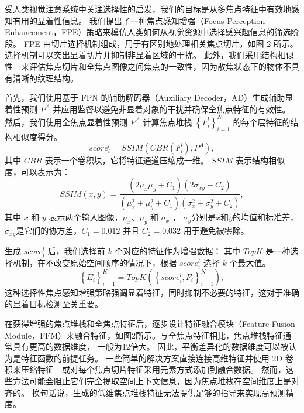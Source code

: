 受人类视觉注意系统中关注选择性的启发，我们的目标是从多焦点特征中有效地感知有用的显着性信息。 我们提出了一种焦点感知增强（Focus Perception Enhancement，FPE）策略来模仿人类如何从视觉资源中选择感兴趣信息的筛选阶段。 FPE 由切片选择机制组成，用于有区别地处理相关焦点切片，如图 2 所示。选择机制可以突出显着切片并抑制非显着区域的干扰。 此外，我们采用结构相似性~\cite{wang2003multiscale}~来评估焦点切片和全焦点图像之间焦点的一致性，因为散焦状态下的物体不具有清晰的纹理结构。 
%
%
%
%
\par
%
%
首先，我们使用基于 FPN 的辅助解码器（Auxiliary Decoder，AD）生成辅助显着性预测 $ P^{A} $ 并应用监督以避免非显着对象的干扰并确保全焦点特征的有效性。 然后，我们使用全焦点显着性预测 $ P^{A} $ 计算焦点堆栈 $ \left \{ F_{i}^{l} \right \}_{i=1}^{N} $ 的每个层特征的结构相似度得分。 
\begin{equation}
	score_{i}^{l} = SSIM \left ( CBR \left ( F_{i}^{l} \right ), P^{A} \right ),
\end{equation}
%
%
其中 $CBR$ 表示一个卷积块，它将特征通道压缩成一维。 $SSIM$ 表示结构相似度，可以表示为： 
%
%
\begin{equation} 	
	SSIM(x,y)=\frac{\left ( 2\mu_{x}\mu_{y}+C_{1} \right ) \left (  2\sigma_{xy}+C_{2} \right )  } 	
	{\left ( \mu_{x}^{2} + \mu_{y}^{2}+C_{1}\right ) \left ( \sigma_{x}^{2}+ \sigma_{y}^{2} + C_{2} \right ) } , 	
\end{equation}
其中 $x$ 和 $y$ 表示两个输入图像，$\mu_{x}$、$\mu_{y}$ 和 $\sigma_{x}$ ， $\sigma_{y}$分别是$x$和$y$的均值和标准差，$\sigma_{xy}$是它们的协方差，$C_{1} = 0.012$ 并且 $C_{2} = 0.032$ 用于避免被零除。 
%
%
%
%
\par
%
%
生成 $ score_{i}^{l} $ 后，我们选择前 $k$ 个对应的特征作为增强数据：
其中 $ TopK $ 是一种选择机制，在不改变原始空间顺序的情况下，根据 $ score_{i}^{l} $ 选择 $k$ 个最大值。 
\begin{equation}
	\left \{ E_{i}^{l} \right \}_{i=1}^{K} = TopK \left ( \left \{ score_{i}^{l}, F_{i}^{l} \right \}_{i=1}^{N} \right ), 	
\end{equation}
%
%
这种选择性焦点感知增强策略强调显着特征，同时抑制不必要的特征，这对于准确的显着目标检测至关重要。
%
%
%
%
\par
%
%
在获得增强的焦点堆栈和全焦点特征后，逐步设计特征融合模块（Feature Fusion Module，FFM）来融合特征，如图2所示。与全焦点特征相比，焦点堆栈特征通常具有更高的数据维度， 一般为12倍大。 因此，平衡差异化的数据维度可以被认为是特征函数的前提任务。
一些简单的解决方案直接连接高维特征并使用 2D 卷积来压缩特征~\cite{piao2021panet}~或对每个焦点切片特征采用元素方式添加到融合数据\cite{liu2021light}。 然而，这些方法可能会阻止它们完全提取空间上下文信息，因为焦点堆栈在空间维度上是对齐的。 换句话说，生成的低维焦点堆栈特征无法提供足够的指导来实现高预测精度。 
%
%
%

